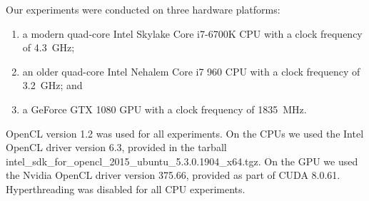 \documentclass[../document.tex]{subfiles}
\begin{document}
\label{ssec:hardware}
	
Our experiments were conducted on three hardware platforms:
\begin{enumerate}
	\item a modern quad-core Intel Skylake Core i7-6700K CPU with a clock frequency of \SI{4.3}{\giga\hertz};
	\item an older quad-core Intel Nehalem Core i7 960 CPU with a clock frequency of \SI{3.2}{\giga\hertz}; and
	\item a GeForce GTX 1080 GPU with a clock frequency of \SI{1835}{\mega\hertz}.
\end{enumerate}

OpenCL version 1.2 was used for all experiments.
On the CPUs we used the Intel OpenCL driver version 6.3, provided in the tarball intel\_sdk\_for\_opencl\_2015\_ubuntu\_5.3.0.1904\_x64.tgz.
On the GPU we used the Nvidia OpenCL driver version 375.66, provided as part of CUDA 8.0.61.
Hyperthreading was disabled for all CPU experiments.
\end{document}

